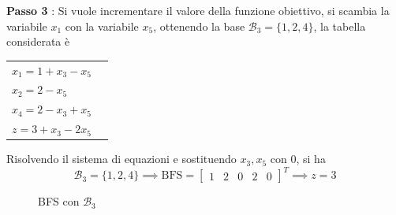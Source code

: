 \documentclass[10pt, letterpaper]{report}
\begin{document}
\textbf{Passo 3} : Si vuole incrementare il valore della funzione obiettivo, si scambia la variabile $x_1$ con la variabile $x_5$, ottenendo la base $\mathcal B_3 = \{1,2,4\}$, la tabella considerata è 
\begin{center}
    \begin{tabular}{|l|l|}\hline 
        $x_1=1+x_3-x_5$\\ 
        $x_2=2-x_5$\\ 
        $x_4=2-x_3+x_5$ \\
        \hline 
        $z=3+x_3-2 x_5$ \\\hline 
    \end{tabular}
\end{center}
Risolvendo il sistema di equazioni e sostituendo $x_3,x_5$ con 0, si ha 
$$ \mathcal{B}_3 = \{1,2,4\}\implies \text{BFS}=\begin{bmatrix}
    1 & 2 & 0 & 2 & 0 
\end{bmatrix}^T \implies z= 3$$
\begin{figure}[h]
    \caption{BFS con $\mathcal B_3$}
\end{figure}
\end{document}
